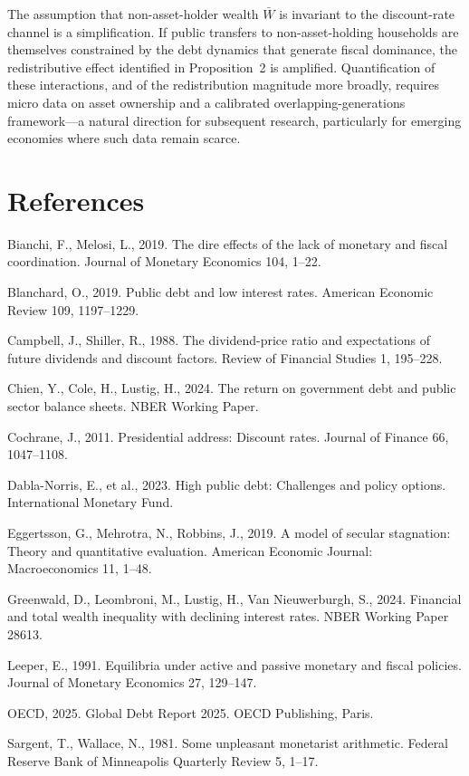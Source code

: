 \documentclass[3p]{elsarticle}
\begin{document}
The assumption that non-asset-holder wealth $\bar{W}$ is invariant to the discount-rate
channel is a simplification. If public transfers to non-asset-holding households are
themselves constrained by the debt dynamics that generate fiscal dominance, the
redistributive effect identified in Proposition~2 is amplified. Quantification of these
interactions, and of the redistribution magnitude more broadly, requires micro data on
asset ownership and a calibrated overlapping-generations framework---a natural direction
for subsequent research, particularly for emerging economies where such data remain scarce.

\section*{References}

Bianchi, F., Melosi, L., 2019. The dire effects of the lack of monetary and fiscal
coordination. Journal of Monetary Economics 104, 1--22.

Blanchard, O., 2019. Public debt and low interest rates.
American Economic Review 109, 1197--1229.

Campbell, J., Shiller, R., 1988. The dividend-price ratio and expectations of
future dividends and discount factors.
Review of Financial Studies 1, 195--228.

Chien, Y., Cole, H., Lustig, H., 2024. The return on government debt and public
sector balance sheets. NBER Working Paper.

Cochrane, J., 2011. Presidential address: Discount rates.
Journal of Finance 66, 1047--1108.

Dabla-Norris, E., et al., 2023. High public debt: Challenges and policy options.
International Monetary Fund.

Eggertsson, G., Mehrotra, N., Robbins, J., 2019. A model of secular stagnation:
Theory and quantitative evaluation.
American Economic Journal: Macroeconomics 11, 1--48.

Greenwald, D., Leombroni, M., Lustig, H., Van Nieuwerburgh, S., 2024. Financial
and total wealth inequality with declining interest rates. NBER Working Paper 28613.

Leeper, E., 1991. Equilibria under active and passive monetary and fiscal policies.
Journal of Monetary Economics 27, 129--147.

OECD, 2025. Global Debt Report 2025. OECD Publishing, Paris.

Sargent, T., Wallace, N., 1981. Some unpleasant monetarist arithmetic.
Federal Reserve Bank of Minneapolis Quarterly Review 5, 1--17.
\end{document}
